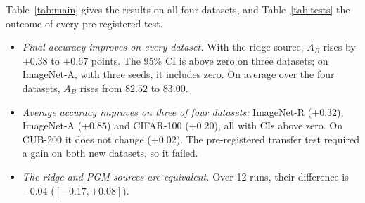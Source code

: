 \begin{table}[t]
\centering
\caption{Every pre-registered test, in the order it was run. $\Delta$ is in
percentage points, with 95\% CI. R: ImageNet-R, A: ImageNet-A.}
\label{tab:tests}
\setlength{\tabcolsep}{3pt}
\end{table}

Table~\ref{tab:main} gives the results on all four datasets, and
Table~\ref{tab:tests} the outcome of every pre-registered test.

\begin{itemize}
  \item \emph{Final accuracy improves on every dataset.} With the ridge
    source, $A_B$ rises by $+0.38$ to $+0.67$ points. The 95\% CI is above
    zero on three datasets; on ImageNet-A, with three seeds, it includes zero.
    On average over the four datasets, $A_B$ rises from $82.52$ to $83.00$.
  \item \emph{Average accuracy improves on three of four datasets:}
    ImageNet-R ($+0.32$), ImageNet-A ($+0.85$) and CIFAR-100 ($+0.20$), all
    with CIs above zero. On CUB-200 it does not change ($+0.02$). The
    pre-registered transfer test required a gain on both new datasets, so it
    failed.
  \item \emph{The ridge and PGM sources are equivalent.} Over 12 runs, their
    difference is $-0.04$ ($[-0.17,+0.08]$).
\end{itemize}

